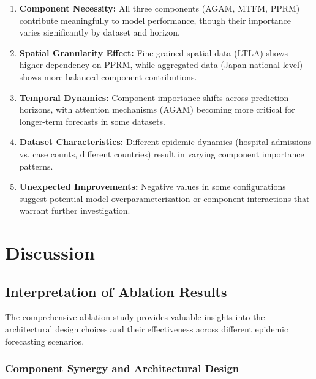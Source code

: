 \documentclass[11pt,a4paper]{article}
\begin{document}
\begin{enumerate}
    \item \textbf{Component Necessity:} All three components (AGAM, MTFM, PPRM) contribute meaningfully to model performance, though their importance varies significantly by dataset and horizon.
    
    \item \textbf{Spatial Granularity Effect:} Fine-grained spatial data (LTLA) shows higher dependency on PPRM, while aggregated data (Japan national level) shows more balanced component contributions.
    
    \item \textbf{Temporal Dynamics:} Component importance shifts across prediction horizons, with attention mechanisms (AGAM) becoming more critical for longer-term forecasts in some datasets.
    
    \item \textbf{Dataset Characteristics:} Different epidemic dynamics (hospital admissions vs. case counts, different countries) result in varying component importance patterns.
    
    \item \textbf{Unexpected Improvements:} Negative values in some configurations suggest potential model overparameterization or component interactions that warrant further investigation.
\end{enumerate}

\section{Discussion}
\label{sec:discussion}

\subsection{Interpretation of Ablation Results}

The comprehensive ablation study provides valuable insights into the architectural design choices and their effectiveness across different epidemic forecasting scenarios.

\subsubsection{Component Synergy and Architectural Design}
\end{document}
